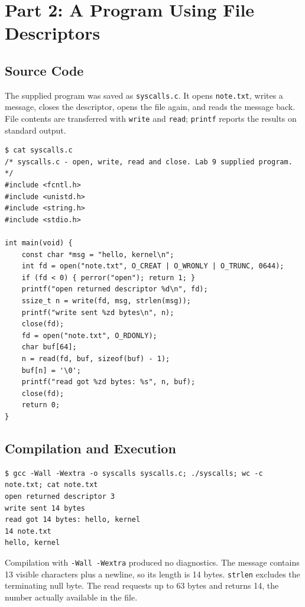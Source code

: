 \documentclass[12pt,a4paper]{article}
\begin{document}
\section{Part 2: A Program Using File Descriptors}
\subsection{Source Code}
The supplied program was saved as \texttt{syscalls.c}. It opens \texttt{note.txt},
writes a message, closes the descriptor, opens the file again, and reads the message
back. File contents are transferred with \texttt{write} and \texttt{read};
\texttt{printf} reports the results on standard output.

\begin{lstlisting}[caption={Source code compiled in the VM}]
$ cat syscalls.c
/* syscalls.c - open, write, read and close. Lab 9 supplied program. */
#include <fcntl.h>
#include <unistd.h>
#include <string.h>
#include <stdio.h>

int main(void) {
    const char *msg = "hello, kernel\n";
    int fd = open("note.txt", O_CREAT | O_WRONLY | O_TRUNC, 0644);
    if (fd < 0) { perror("open"); return 1; }
    printf("open returned descriptor %d\n", fd);
    ssize_t n = write(fd, msg, strlen(msg));
    printf("write sent %zd bytes\n", n);
    close(fd);
    fd = open("note.txt", O_RDONLY);
    char buf[64];
    n = read(fd, buf, sizeof(buf) - 1);
    buf[n] = '\0';
    printf("read got %zd bytes: %s", n, buf);
    close(fd);
    return 0;
}
\end{lstlisting}

\subsection{Compilation and Execution}

\begin{lstlisting}[caption={Compilation, execution, and inspection of the written file}]
$ gcc -Wall -Wextra -o syscalls syscalls.c; ./syscalls; wc -c note.txt; cat note.txt
open returned descriptor 3
write sent 14 bytes
read got 14 bytes: hello, kernel
14 note.txt
hello, kernel
\end{lstlisting}

Compilation with \texttt{-Wall -Wextra} produced no diagnostics. The message
contains 13 visible characters plus a newline, so its length is 14 bytes.
\texttt{strlen} excludes the terminating null byte. The read requests up to 63
bytes and returns 14, the number actually available in the file.
\end{document}

